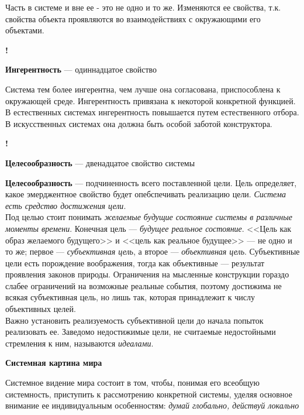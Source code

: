\documentclass{article}
\newcommand{\note}[1]{\textit{#1}}
\renewcommand{\subsection}[1]{
	\vspace{2em}
	\begin{flushright}
		\large
		\textbf{#1}
	\end{flushright}
	}
\newcommand{\define}[2]{
	\textbf{#1} --- #2
	}
\newcommand{\marked}[2]{
	\begin{flushright}\textbf{!}\hspace{2ex}\vline\hspace{2ex}
		\begin{minipage}{0.9\textwidth}
			\define{#1}{#2}
		\end{minipage}
	\end{flushright}
	}
\begin{document}
Часть в системе и вне ее - это не одно и то же. Изменяются ее свойства, т.к. свойства объекта проявляются во взаимодействиях с окружающими его объектами.
\marked{Ингерентность}{одиннадцатое свойство}
Система тем более ингерентна, чем лучше она согласована, приспособлена к окружающей среде. Ингерентность привязана к некоторой конкретной функцией.\\
В естественных системах ингерентность повышается путем естественного отбора. В искусственных системах она должна быть особой заботой конструктора.
\marked{Целесообразность}{двенадцатое свойство системы}
\define{Целесообразность}{подчиненность всего поставленной цели.}Цель определяет, какое эмерджентное свойство будет опебспечивать реализацию цели. \note{Система есть средство достижения цели}.\\
Под целью стоит понимать \note{желаемые будущие состояние системы в различные моменты времени}. Конечная цель --- \note{будущее реальное состояние}. <<Цель как образ желаемого будущего>> и <<цель как реальное будущее>> --- не одно и то же; первое --- \note{субъективная цель}, а второе --- \note{объективная цель}. Субъективные цели есть порождение воображения, тогда как объективные --- результат проявления законов природы.  Ограничения на мысленные конструкции гораздо слабее ограничений на возможные реальные события, поэтому достижима не всякая субъективная цель, но лишь так, которая принадлежит к числу объективных целей.\\
Важно установить реализуемость субъективной цели до начала попыток реализовать ее. Заведомо недостижимые цели, не считаемые недостойными стремления к ним, называются \note{идеалами}.
\subsection{Системная картина мира}
Системное видение мира состоит в том, чтобы, понимая его всеобщую системность, приступить к рассмотрению конкретной системы, уделяя основное внимание ее индивидуальным особенностям: \note{думай глобально, действуй локально}
\end{document}
